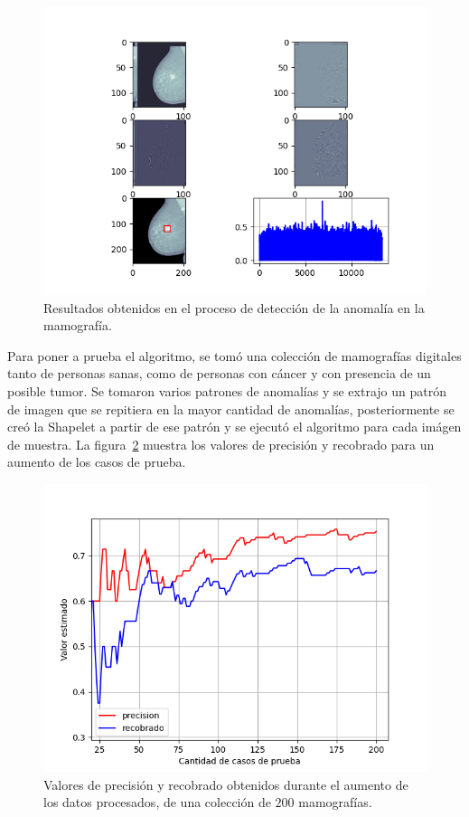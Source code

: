 \begin{figure}[h]
\center
\includegraphics[scale=1]{Graphics/MamografiaDetect.png}
\caption{Resultados obtenidos en el proceso de detecci\'on de la anomal\'ia en la mamograf\'ia.}
\label{detect-anomalia}
\end{figure}

\par Para poner a prueba el algoritmo, se tom\'o una colecci\'on de mamograf\'ias digitales tanto de personas sanas, como de personas con c\'ancer y con presencia de un posible tumor. Se tomaron varios patrones de anomal\'ias y se extrajo un patr\'on de imagen que se repitiera en la mayor cantidad de anomal\'ias, posteriormente se cre\'o la Shapelet a partir de ese patr\'on y se ejecut\'o el algoritmo para cada im\'agen de muestra. La figura~\ref{prec-rec-2d} muestra los valores de precisi\'on y recobrado para un aumento de los casos de prueba.

\begin{figure}[h]
\center
\includegraphics[scale=.5]{Graphics/PrecRec2D.png}
\caption{Valores de precisi\'on y recobrado obtenidos durante el aumento de los datos procesados, de una colecci\'on de $200$ mamograf\'ias.}
\label{prec-rec-2d}
\end{figure}

